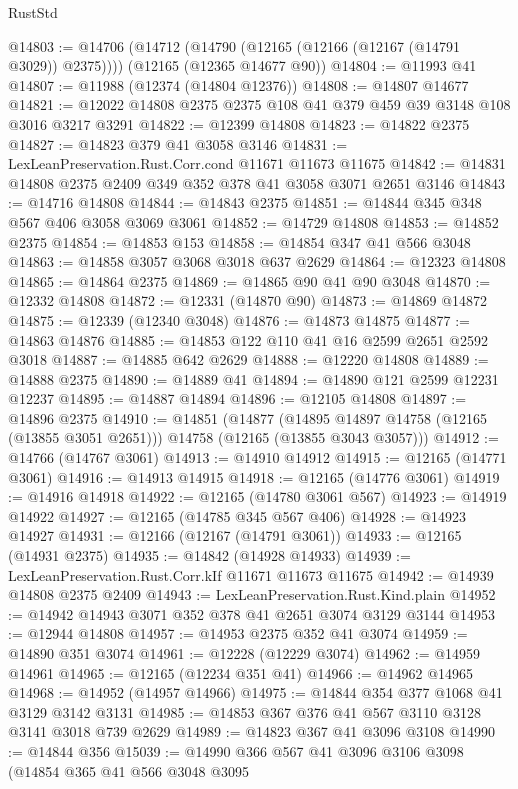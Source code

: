 \begin{lexlean}{RustStd}
\begin{coremodule}
@14803 := @14706
    (@14712 (@14790 (@12165 (@12166 (@12167 (@14791 @3029)) @2375))))
    (@12165 (@12365 @14677 @90))
@14804 := @11993 @41
@14807 := @11988 (@12374 (@14804 @12376))
@14808 := @14807 @14677
@14821 := @12022 @14808 @2375 @2375 @108 @41 @379 @459 @39 @3148 @108 @3016 @3217 @3291
@14822 := @12399 @14808
@14823 := @14822 @2375
@14827 := @14823 @379 @41 @3058 @3146
@14831 := LexLeanPreservation.Rust.Corr.cond @11671 @11673 @11675
@14842 := @14831 @14808 @2375 @2409 @349 @352 @378 @41 @3058 @3071 @2651 @3146
@14843 := @14716 @14808
@14844 := @14843 @2375
@14851 := @14844 @345 @348 @567 @406 @3058 @3069 @3061
@14852 := @14729 @14808
@14853 := @14852 @2375
@14854 := @14853 @153
@14858 := @14854 @347 @41 @566 @3048
@14863 := @14858 @3057 @3068 @3018 @637 @2629
@14864 := @12323 @14808
@14865 := @14864 @2375
@14869 := @14865 @90 @41 @90 @3048
@14870 := @12332 @14808
@14872 := @12331 (@14870 @90)
@14873 := @14869 @14872
@14875 := @12339 (@12340 @3048)
@14876 := @14873 @14875
@14877 := @14863 @14876
@14885 := @14853 @122 @110 @41 @16 @2599 @2651 @2592 @3018
@14887 := @14885 @642 @2629
@14888 := @12220 @14808
@14889 := @14888 @2375
@14890 := @14889 @41
@14894 := @14890 @121 @2599 @12231 @12237
@14895 := @14887 @14894
@14896 := @12105 @14808
@14897 := @14896 @2375
@14910 := @14851
    (@14877
      (@14895 @14897 @14758 (@12165 (@13855 @3051 @2651)))
      @14758
      (@12165 (@13855 @3043 @3057)))
@14912 := @14766 (@14767 @3061)
@14913 := @14910 @14912
@14915 := @12165 (@14771 @3061)
@14916 := @14913 @14915
@14918 := @12165 (@14776 @3061)
@14919 := @14916 @14918
@14922 := @12165 (@14780 @3061 @567)
@14923 := @14919 @14922
@14927 := @12165 (@14785 @345 @567 @406)
@14928 := @14923 @14927
@14931 := @12166 (@12167 (@14791 @3061))
@14933 := @12165 (@14931 @2375)
@14935 := @14842 (@14928 @14933)
@14939 := LexLeanPreservation.Rust.Corr.kIf @11671 @11673 @11675
@14942 := @14939 @14808 @2375 @2409
@14943 := LexLeanPreservation.Rust.Kind.plain
@14952 := @14942 @14943 @3071 @352 @378 @41 @2651 @3074 @3129 @3144
@14953 := @12944 @14808
@14957 := @14953 @2375 @352 @41 @3074
@14959 := @14890 @351 @3074
@14961 := @12228 (@12229 @3074)
@14962 := @14959 @14961
@14965 := @12165 (@12234 @351 @41)
@14966 := @14962 @14965
@14968 := @14952 (@14957 @14966)
@14975 := @14844 @354 @377 @1068 @41 @3129 @3142 @3131
@14985 := @14853 @367 @376 @41 @567 @3110 @3128 @3141 @3018 @739 @2629
@14989 := @14823 @367 @41 @3096 @3108
@14990 := @14844 @356
@15039 := @14990
    @366
    @567
    @41
    @3096
    @3106
    @3098
    (@14854
      @365
      @41
      @566
      @3048
      @3095

\end{coremodule}
\end{lexlean}
